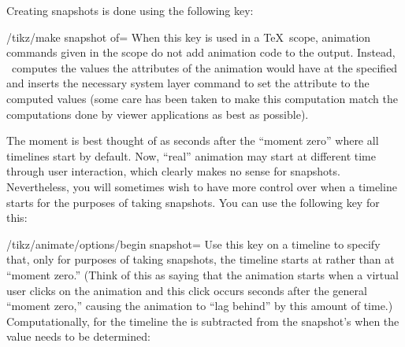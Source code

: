 Creating snapshots is done using the following key:

\begin{key}{/tikz/make snapshot of=}
  When this key is used in a \TeX\ scope, animation commands given in
  the scope do not add animation code to the output. Instead,
  \tikzname\ computes the values the attributes of the animation would
  have at the specified  and inserts the necessary system
  layer command to set the attribute to the computed values (some care
  has been taken to make this computation match the computations done
  by viewer applications as best as possible). 
  
\begin{codeexample}[]
\end{codeexample}

  The moment  is best thought of as  seconds
  after the ``moment zero'' where all timelines start by default. Now,
  ``real'' animation may start at different time through user
  interaction, which clearly makes no sense for
  snapshots. Nevertheless, you will sometimes wish to have more
  control over when a timeline starts for the purposes of taking
  snapshots. You can use the following key for this:

  \begin{key}{/tikz/animate/options/begin snapshot=}
    Use this key on a timeline to specify that, only for purposes of
    taking snapshots, the timeline starts at  rather
    than at ``moment zero.'' (Think of this as saying that the
    animation starts when a virtual user clicks on the animation and
    this click occurs  seconds after the general
    ``moment zero,'' causing the animation to ``lag behind'' by this
    amount of time.) Computationally, for the timeline the  is subtracted from the snapshot's  when the
    value needs to be determined: 
\begin{codeexample}[]
\end{codeexample}
  \end{key}


\end{key}
